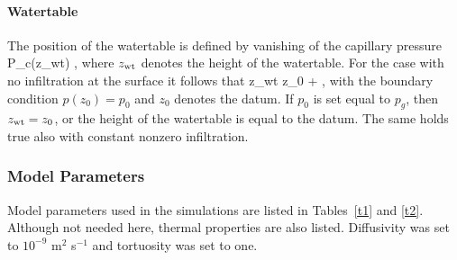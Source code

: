 \paragraph{Watertable}

The position of the watertable is defined by vanishing of the capillary pressure
\EQ
P_c(z_{\rm wt}) ,
\EN
where $z_{\rm wt}$ denotes the height of the watertable. For the case with no infiltration at the surface it follows that
\EQ
z_{\rm wt} \eq z_0 + ,
\EN
with the boundary condition $p(z_0) = p_0$ and $z_0$ denotes the datum. If $p_0$ is set equal to $p_g$, then $z_{\rm wt} = z_0$, or the height of the watertable is equal to the datum.
The same holds true also with constant nonzero infiltration. 

\subsubsection{Model Parameters}

Model parameters used in the simulations are listed in Tables~\ref{t1} and \ref{t2}. Although not needed here, thermal properties are also listed. Diffusivity was set to $10^{-9}$ m$^2$ s$^{-1}$ and tortuosity was set to one.

\renewcommand{\tabcolsep}{1.7mm}


